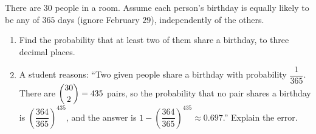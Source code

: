 There are $30$ people in a room. Assume each person's birthday is equally likely to be any of $365$ days (ignore February $29$), independently of the others.
\begin{enumerate}
\item[(a)] Find the probability that at least two of them share a birthday, to three decimal places.
\item[(b)] A student reasons: ``Two given people share a birthday with probability $\dfrac{1}{365}$. There are $\dbinom{30}{2}=435$ pairs, so the probability that no pair shares a birthday is $\left(\dfrac{364}{365}\right)^{435}$, and the answer is $1-\left(\dfrac{364}{365}\right)^{435}\approx0.697$.'' Explain the error.
\end{enumerate}
